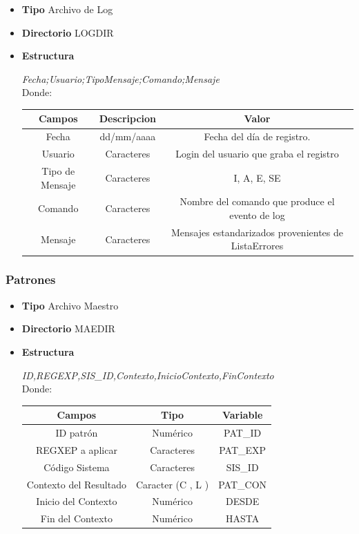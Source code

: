 \documentclass[a4paper,10pt,titlepage]{article}
\begin{document}
			\begin {itemize}
				\item \textbf{Tipo} {Archivo de Log}
				\item \textbf{Directorio} {LOGDIR}
				\item \textbf{Estructura} {	\textit{Fecha;Usuario;TipoMensaje;Comando;Mensaje}\\
					Donde: \ 
					\begin{table}[H]
					\centering
					\begin{tabular}{| c | c | c |}
						\hline
						Campos 	& Descripcion & Valor \\
						\hline
							Fecha  &dd/mm/aaaa &	Fecha del día de registro. \\
						\hline 
						 Usuario & Caracteres 	&  Login del usuario que graba el registro\\
						\hline
						Tipo de Mensaje	 &	Caracteres	& 	I, A, E, SE \\
						\hline
						Comando & Caracteres & Nombre del comando que produce el evento de log \\
						\hline
						Mensaje &  Caracteres & Mensajes estandarizados provenientes de ListaErrores \\
							\hline

					\end{tabular}
					\end{table}
				}
			\end{itemize}

		\subsubsection{Patrones}

			\begin {itemize}
				\item \textbf{Tipo} {Archivo Maestro}
				\item \textbf{Directorio} {MAEDIR}
				\item \textbf{Estructura} {\textit{ID,REGEXP,SIS\_ID,Contexto,InicioContexto,FinContexto}\\
					Donde: \ 
					\begin{table}[H]
					\centering
					\begin{tabular}{| c | c | c |}
						\hline
						Campos 	& Tipo & Variable\\
						\hline
							ID patrón  & Numérico & PAT\_ID \\
						\hline 
						 REGXEP a aplicar& Caracteres 	& PAT\_EXP\\
						\hline
						Código Sistema  &	Caracteres	& SIS\_ID\\
						\hline
						Contexto del Resultado & Caracter (C , L ) & PAT\_CON\\
						\hline
						Inicio del Contexto & Numérico & DESDE\\
							\hline
						Fin del Contexto & Numérico & HASTA\\
							\hline

					\end{tabular}
					\end{table}
				}
			\end{itemize}
\end{document}
